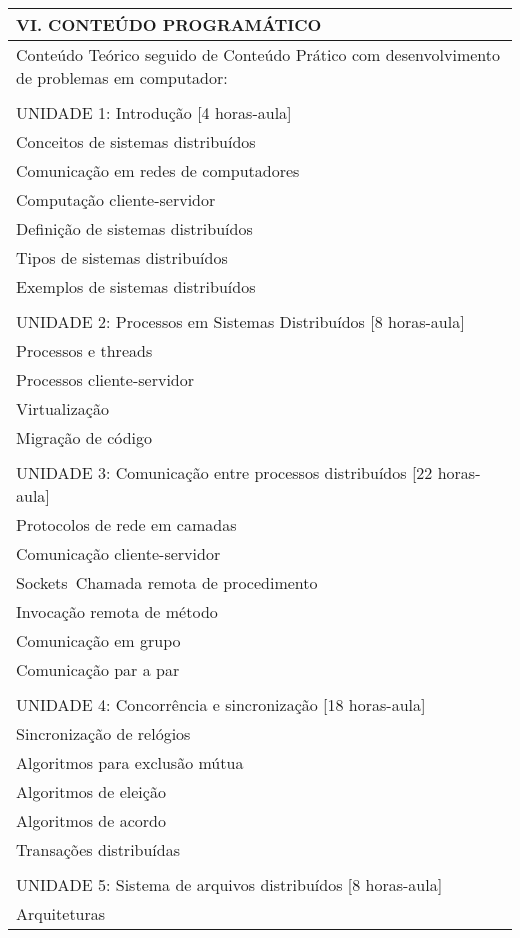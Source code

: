 \documentclass[12pt]{article}
\begin{document}
\begin{longtable}{|L{1.025\textwidth}|} \hline
%
{\bf VI. CONTEÚDO PROGRAMÁTICO } \\ \hline

Conteúdo Teórico seguido de Conteúdo Prático com desenvolvimento de problemas em computador: \\
\\
UNIDADE 1: Introdução [4 horas-aula]\\
Conceitos de sistemas distribuídos\\
Comunicação em redes de computadores\\
Computação cliente-servidor\\
Definição de sistemas distribuídos\\
Tipos de sistemas distribuídos\\
Exemplos de sistemas distribuídos\\
\\
UNIDADE 2: Processos em Sistemas Distribuídos [8 horas-aula]\\
Processos e threads\\
Processos cliente-servidor\\
Virtualização\\
Migração de código\\
\\
UNIDADE 3: Comunicação entre processos distribuídos [22 horas-aula]\\
Protocolos de rede em camadas\\
Comunicação cliente-servidor\\
Sockets\
Chamada remota de procedimento\\
Invocação remota de método\\
Comunicação em grupo\\
Comunicação par a par\\
\\
UNIDADE 4:  Concorrência e sincronização [18 horas-aula]\\
Sincronização de relógios\\
Algoritmos para exclusão mútua\\
Algoritmos de eleição\\
Algoritmos de acordo\\
Transações distribuídas\\
\\
UNIDADE 5: Sistema de arquivos distribuídos [8 horas-aula]\\
Arquiteturas\\

\end{longtable}
\end{document}

